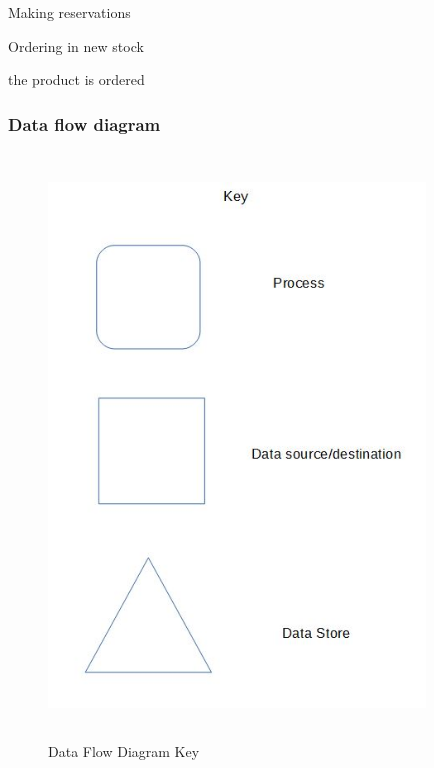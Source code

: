 \begin{algorithm}[H]
    \caption{Making reservations}
\begin{algorithmic}[2]
\State
{}
    \EndIf
\EndWhile
\end{algorithmic}
\end{algorithm}

\begin{algorithm}[H]
    \caption{Ordering in new stock}
\begin{algorithmic}[3]
\State
{}
        the product is ordered
    \EndIf
\EndWhile
\end{algorithmic}
\end{algorithm}

\subsubsection{Data flow diagram}

\begin{figure}[H]
	\centering
	\includegraphics[width= 10cm, height = 15.5cm]{Analysis/images/dfd_key.JPG}
	\caption {Data Flow Diagram Key} \label{fig:data_diagram_key}
\end{figure}

